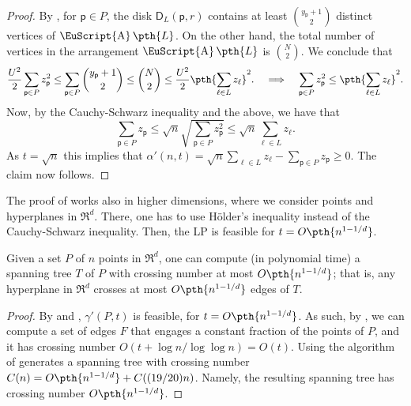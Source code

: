 \documentclass[12pt]{article}
\newcommand{\PntSet}{P}
\newcommand{\pnt}{\mathsf{p}}
\newcommand{\lineA}{\ell}
\newcommand{\Term}[1]{\textsf{#1}}
\newcommand{\LP}{\Term{L{}P}\xspace}
\newcommand{\ArrX}[1]{\mathop{\mathrm{\EuScript{A}}}\pth{#1}}
\newcommand{\diskCr}[2]{\mathsf{D}_{#1}(#2)}
\newcommand{\LineSet}{L}
\providecommand{\Holder}{H\"older\xspace}
\begin{document}
\begin{proof}
    By , for $\pnt \in \PntSet$, the disk
    $\diskCr{\LineSet}{\pnt, r}$ contains at least
    $\binom{y_\pnt+1}{2}$ distinct vertices of $\ArrX{\LineSet}$. On
    the other hand, the total number of vertices in the arrangement
    $\ArrX{\LineSet}$ is $\binom{N}{2}$. We conclude that
    \[
    \frac{U^2}{2} \sum_{\pnt \in \PntSet} z_\pnt^2 \leq \sum_{\pnt \in
       \PntSet} \binom{y_\pnt+1}{2} \leq \binom{N}{2} \leq \frac{U^2}{2}
    \pth{\sum_{\lineA \in\LineSet} z_\lineA}^2.  \;\;\; \implies
    \;\;\; \sum_{\pnt \in \PntSet} z_\pnt^2 \leq  \pth{\sum_{\lineA
          \in\LineSet} z_\lineA}^2.
    \]
    Now, by the Cauchy-Schwarz inequality and the above, we have that
    \[
    \sum_{\pnt \in \PntSet} z_\pnt \leq \sqrt{n}\sqrt{ \sum_{\pnt \in
          \PntSet} z_\pnt^2}
    \leq
    \sqrt{n} \sum_{\lineA \in\LineSet} z_\lineA.    
    \]
    As $t=\sqrt{n}$ this implies that $\alpha'(n,t) = \sqrt{n}
    \sum_{\lineA \in\LineSet} z_\lineA - \sum_{\pnt \in \PntSet}
    z_\pnt \geq 0$. The claim now follows.
\end{proof}



\begin{remark}
    The proof of  works also in higher dimensions,
    where we consider points and hyperplanes in $\Re^d$. There, one
    has to use \Holder's inequality instead of the Cauchy-Schwarz
    inequality. Then, the \LP is feasible for $t = O\pth{
       n^{1-1/d}}$.
\end{remark}


\begin{theorem}
    Given a set $\PntSet$ of $n$ points in $\Re^d$, one can compute
    (in polynomial time) a spanning tree $T$ of $\PntSet$ with crossing
    number at most $O\pth{ n^{1-1/d}}$; that is, any hyperplane in
    $\Re^d$ crosses at most $O\pth{ n^{1-1/d}}$ edges of $T$.
\end{theorem}
\begin{proof}
    By  and , $\gamma'(\PntSet, t )$ is
    feasible, for $t =O\pth{ n^{1-1/d}}$. As such, by
    , we can compute a set of edges $F$ that engages
    a constant fraction of the points of $\PntSet$, and it has
    crossing number $O( t + \log n / \log \log n ) = O(t)$.  Using the
    algorithm of  generates a spanning tree with
    crossing number $C(n) = O\pth{n^{1-1/d}} + C((19/20)n )$. Namely,
    the resulting spanning tree has crossing number
    $O\pth{n^{1-1/d}}$.
\end{proof}
\end{document}
